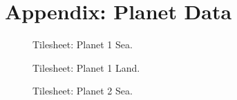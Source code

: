 \chapter{Appendix: Planet Data}

\clearpage

\clearpage

\clearpage

\clearpage

\clearpage


\begin{figure}[H]
{
  \setlength{\tabcolsep}{3.0pt}
  \setlength\cmidrulewidth{\heavyrulewidth} %
    \begin{adjustbox}{width=10cm,center}
  \begin{subfigure}{0.3\textwidth}
  
  \end{subfigure}
  \begin{subfigure}{0.3\textwidth}
  
  \end{subfigure}
  \end{adjustbox}
}\caption[]{Tilesheet: Planet 1 Sea.}
\end{figure}


\begin{figure}[H]
{
  \setlength{\tabcolsep}{3.0pt}
  \setlength\cmidrulewidth{\heavyrulewidth} %
    \begin{adjustbox}{width=10cm,center}
  \begin{subfigure}{0.3\textwidth}
  
  \end{subfigure}
  \begin{subfigure}{0.3\textwidth}
  
  \end{subfigure}
  \end{adjustbox}
}\caption[]{Tilesheet: Planet 1 Land.}
\end{figure}


\begin{figure}[H]
{
  \setlength{\tabcolsep}{3.0pt}
  \setlength\cmidrulewidth{\heavyrulewidth} %
    \begin{adjustbox}{width=10cm,center}
  \begin{subfigure}{0.3\textwidth}
  
  \end{subfigure}
  \begin{subfigure}{0.3\textwidth}
  
  \end{subfigure}
  \end{adjustbox}
}\caption[]{Tilesheet: Planet 2 Sea.}
\end{figure}



